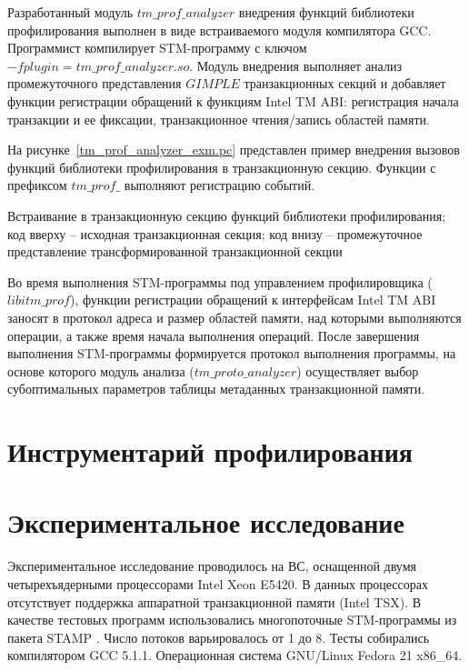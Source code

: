 Разработанный модуль $tm\_prof\_analyzer$ внедрения функций библиотеки профилирования выполнен в виде встраиваемого модуля компилятора GCC. Программист компилирует STM-программу с ключом $-fplugin=tm\_prof\_analyzer.so$. Модуль внедрения выполняет анализ промежуточного представления $GIMPLE$ транзакционных секций и добавляет функции регистрации обращений к функциям Intel TM ABI: регистрация начала транзакции и ее фиксации, транзакционное чтения/запись областей памяти.

На рисунке~\ref{tm_prof_analyzer_exm.pc} представлен пример внедрения вызовов функций библиотеки профилирования в транзакционную секцию. Функции с префиксом $tm\_prof\_$ выполняют регистрацию событий.


\begin{ListingEnv}[!h]


\caption{Встраивание в транзакционную секцию функций библиотеки профилирования; код вверху -- исходная транзакционная секция; код внизу -- промежуточное представление трансформированной транзакционной секции}
\label{list:tm_prof_analyzer_exm.pc}
\end{ListingEnv}

Во время выполнения STM-программы под управлением профилировщика ($libitm\_prof$), функции регистрации обращений к интерфейсам Intel TM ABI заносят в протокол адреса и размер областей памяти, над которыми выполняются операции, а также время начала выполнения операций. После завершения выполнения STM-программы формируется протокол выполнения программы, на основе которого модуль анализа ($tm\_proto\_analyzer$) осуществляет выбор субоптимальных параметров таблицы метаданных транзакционной памяти.

\section{Инструментарий профилирования}

\section{Экспериментальное исследование}

Экспериментальное исследование проводилось на ВС, оснащенной двумя четырехъядерными процессорами Intel Xeon E5420. В данных процессорах отсутствует поддержка аппаратной транзакционной памяти (Intel TSX). В качестве тестовых программ использовались многопоточные STM-программы из пакета STAMP \cite{spear_strategy_for_cm, spear_ringstm, dice_shavit_tl2}. Число потоков варьировалось от 1 до 8. Тесты собирались компилятором GCC 5.1.1. Операционная система GNU/Linux Fedora 21 x86\_64. 

